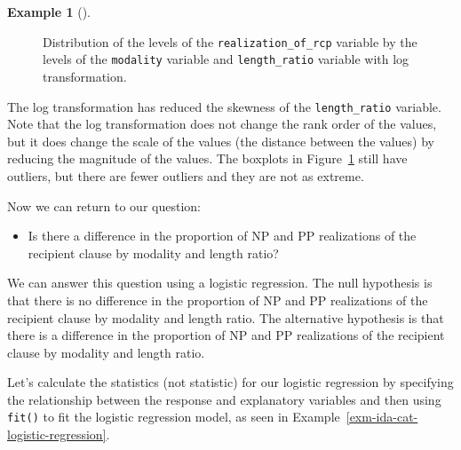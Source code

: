 \documentclass[
  letterpaper,
  DIV=11,
  numbers=noendperiod]{scrreprt}
\providecommand{\tightlist}{%
  \setlength{\itemsep}{0pt}\setlength{\parskip}{0pt}}\usepackage{longtable,booktabs,array}
\theoremstyle{definition}
\newtheorem{example}{Example}[chapter]
\theoremstyle{remark}
\begin{document}
\begin{example}[]
\begin{figure}[H]
\begin{minipage}{0.50\linewidth}


\end{minipage}%

\caption{\label{fig-ida-cat-bivariate-length-ratio-log}Distribution of
the levels of the \texttt{realization\_of\_rcp} variable by the levels
of the \texttt{modality} variable and \texttt{length\_ratio} variable
with log transformation.}

\end{figure}%

\end{example}

The log transformation has reduced the skewness of the
\texttt{length\_ratio} variable. Note that the log transformation does
not change the rank order of the values, but it does change the scale of
the values (the distance between the values) by reducing the magnitude
of the values. The boxplots in
Figure~\ref{fig-ida-cat-bivariate-length-ratio-log} still have outliers,
but there are fewer outliers and they are not as extreme.

Now we can return to our question:

\begin{itemize}
\tightlist
\item
  Is there a difference in the proportion of NP and PP realizations of
  the recipient clause by modality and length ratio?
\end{itemize}

We can answer this question using a logistic regression. The null
hypothesis is that there is no difference in the proportion of NP and PP
realizations of the recipient clause by modality and length ratio. The
alternative hypothesis is that there is a difference in the proportion
of NP and PP realizations of the recipient clause by modality and length
ratio.

Let's calculate the statistics (not statistic) for our logistic
regression by specifying the relationship between the response and
explanatory variables and then using \texttt{fit()} to fit the logistic
regression model, as seen in
Example~\ref{exm-ida-cat-logistic-regression}.
\end{document}
